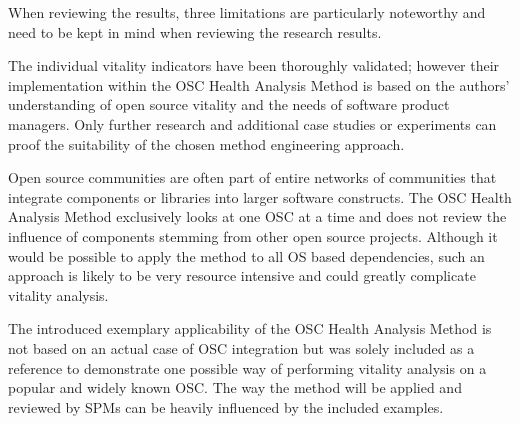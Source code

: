 \documentclass[final,5p,times,twocolumn]{elsarticle}
\begin{document}
When reviewing the results, three limitations are particularly noteworthy and need to be kept in mind when reviewing the research results.

The individual vitality indicators have been thoroughly validated; however their implementation within the OSC Health Analysis Method is based on the authors' understanding of open source vitality and the needs of software product managers. Only further research and additional case studies or experiments can proof the suitability of the chosen method engineering approach.

Open source communities are often part of entire networks of communities that integrate components or libraries into larger software constructs. The OSC Health Analysis Method exclusively looks at one OSC at a time and does not review the influence of components stemming from other open source projects. Although it would be possible to apply the method to all OS based dependencies, such an approach is likely to be very resource intensive and could greatly complicate vitality analysis.

The introduced exemplary applicability of the OSC Health Analysis Method is not based on an actual case of OSC integration but was solely included as a reference to demonstrate one possible way of performing vitality analysis on a popular and widely known OSC. The way the method will be applied and reviewed by SPMs can be heavily influenced by the included examples.







\end{document}
